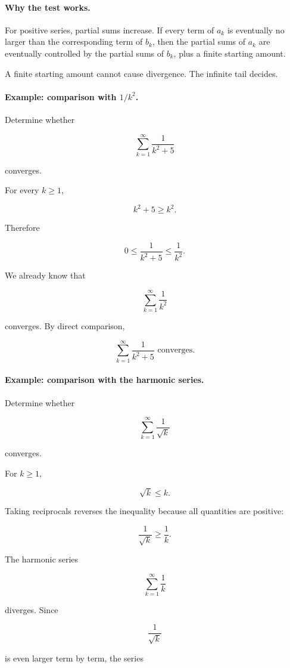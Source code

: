 \paragraph{Why the test works.}
For positive series, partial sums increase.  If every term of \(a_k\) is eventually no
larger than the corresponding term of \(b_k\), then the partial sums of \(a_k\) are
eventually controlled by the partial sums of \(b_k\), plus a finite starting amount.

A finite starting amount cannot cause divergence.  The infinite tail decides.

\paragraph{Example: comparison with \(1/k^2\).}
Determine whether

\[
\sum_{k=1}^{\infty}\frac1{k^2+5}
\]

converges.

For every \(k\ge1\),

\[
k^2+5\ge k^2.
\]

Therefore

\[
0\le \frac1{k^2+5}\le \frac1{k^2}.
\]

We already know that

\[
\sum_{k=1}^{\infty}\frac1{k^2}
\]

converges.  By direct comparison,

\[
\boxed{
\sum_{k=1}^{\infty}\frac1{k^2+5} \text{ converges.}
}
\]

\paragraph{Example: comparison with the harmonic series.}
Determine whether

\[
\sum_{k=1}^{\infty}\frac1{\sqrt{k}}
\]

converges.

For \(k\ge1\),

\[
\sqrt{k}\le k.
\]

Taking reciprocals reverses the inequality because all quantities are positive:

\[
\frac1{\sqrt{k}}\ge \frac1k.
\]

The harmonic series

\[
\sum_{k=1}^{\infty}\frac1k
\]

diverges.  Since

\[
\frac1{\sqrt{k}}
\]

is even larger term by term, the series

